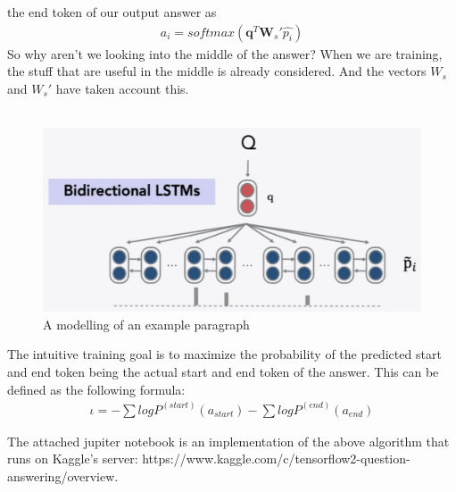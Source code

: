 \documentclass[paper=a4, fontsize=12pt]{scrartcl}
\begin{document}
the end token of our output answer as
\begin{align*}
a_i = softmax(\mathbf{q}^T \mathbf{W}_s' \hat{p_i})
\end{align*}
So why aren't we looking into the middle of the answer? When we are training, the stuff that are useful in the middle is already considered. And the vectors $W_s$ and $W_s'$ have taken account this. \\\\
 \begin{figure}
  \includegraphics[scale=0.6]{a.png}
  \caption{A modelling of an example paragraph}
  \label{fig:skip-gram}
\end{figure}
The intuitive training goal is to maximize the probability of the predicted start and end token being the actual start and end token of the answer. This can be defined as the following formula:
\begin{align*}
\iota = - \sum log P^{(start)} (a_{start}) - \sum log P^{(end)} (a_{end})
\end{align*}

The attached jupiter notebook is an implementation of the above algorithm that runs on Kaggle's server: https://www.kaggle.com/c/tensorflow2-question-answering/overview.


\clearpage
\end{document}
